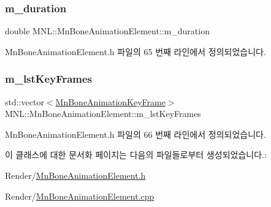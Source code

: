 \subsubsection{\texorpdfstring{m\+\_\+duration}{m\_duration}}
{\footnotesize\ttfamily double M\+N\+L\+::\+Mn\+Bone\+Animation\+Element\+::m\+\_\+duration\hspace{0.3cm}{\ttfamily [private]}}



Mn\+Bone\+Animation\+Element.\+h 파일의 65 번째 라인에서 정의되었습니다.

\mbox{\label{class_m_n_l_1_1_mn_bone_animation_element_adb31ea7e47450a243d3b87ceadab86d0}} 
\subsubsection{\texorpdfstring{m\+\_\+lst\+Key\+Frames}{m\_lstKeyFrames}}
{\footnotesize\ttfamily std\+::vector$<$\hyperlink{struct_m_n_l_1_1_mn_bone_animation_key_frame}{Mn\+Bone\+Animation\+Key\+Frame}$>$ M\+N\+L\+::\+Mn\+Bone\+Animation\+Element\+::m\+\_\+lst\+Key\+Frames\hspace{0.3cm}{\ttfamily [private]}}



Mn\+Bone\+Animation\+Element.\+h 파일의 66 번째 라인에서 정의되었습니다.



이 클래스에 대한 문서화 페이지는 다음의 파일들로부터 생성되었습니다.\+:\begin{DoxyCompactItemize}
\item 
Render/\hyperlink{_mn_bone_animation_element_8h}{Mn\+Bone\+Animation\+Element.\+h}\item 
Render/\hyperlink{_mn_bone_animation_element_8cpp}{Mn\+Bone\+Animation\+Element.\+cpp}\end{DoxyCompactItemize}
